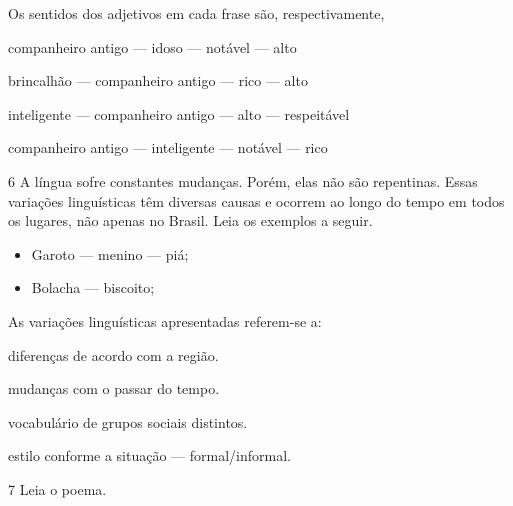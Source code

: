 Os sentidos dos adjetivos em cada frase são, respectivamente,

\begin{escolha}
\item companheiro antigo --- idoso --- notável --- alto

\item brincalhão --- companheiro antigo --- rico --- alto

\item inteligente --- companheiro antigo --- alto --- respeitável

\item companheiro antigo --- inteligente --- notável --- rico
\end{escolha}

\num{6} A língua sofre constantes mudanças. Porém, elas não são repentinas. Essas
variações linguísticas têm diversas causas e ocorrem ao longo do tempo em todos os
lugares, não apenas no Brasil. Leia os exemplos a seguir.

\begin{myquote}
\begin{itemize}
\item Garoto --- menino --- piá;

\item Bolacha --- biscoito;
\end{itemize}
\end{myquote}

As variações linguísticas apresentadas referem-se a:

\begin{escolha}
\item diferenças de acordo com a região.

\item mudanças com o passar do tempo.

\item vocabulário de grupos sociais distintos.

\item estilo conforme a situação --- formal/informal.
\end{escolha}

\pagebreak
\num{7} Leia o poema.

